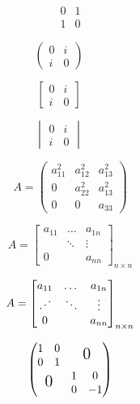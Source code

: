 \documentclass{ctexart}
\newcommand{\adots}{\mathinner{\mkern2mu\raisebox{0.1em}{.}\mkern2mu\raisebox{0.4em}{.}\mkern2mu\raisebox{0.7em}{.}\mkern1mu}}
\begin{document}
	\[
	\begin{matrix} %
		0 & 1 \\
		1 & 0
	\end{matrix}
	\] %
	
	\[
	\begin{pmatrix} %
		0 & i \\
		i & 0
	\end{pmatrix} \qquad
	\]
	
	\[
	\begin{bmatrix} %
		0 & i \\
		i & 0
	\end{bmatrix} \qquad
	\]

	\[
	\begin{vmatrix} %
		0 & i \\
		i & 0
	\end{vmatrix} \qquad
	\]
	
	\[
	A = \begin{pmatrix} %
		a_{11}^2 	& a_{12}^2 	& a_{13}^2 \\
		0 			& a_{22}^2 	& a_{13}^2 \\
		0 			& 0 		& a_{33}
	\end{pmatrix}
	\]
	
	\[
	A = \begin{bmatrix} %
		a_{11} 		& \dots 		& a_{1n} \\
		 			& \ddots 		& \vdots \\
		0 			&  				& a_{nn}
	\end{bmatrix}_{n \times n}
	\]
	
	\[
	A = \begin{bmatrix} %
		a_{11} 		& \dots 		& a_{1n} \\
		\adots		& \ddots 		& \vdots \\
		0 			&  				& a_{nn}
	\end{bmatrix}_{n \times n}
	\]
	
	\[
	\begin{pmatrix}
		\begin{matrix}
			1 & 0 \\
			0 & 1
		\end{matrix} 	& 	\text{\Large 0} \\
		\text{\Large 0} & 	\begin{matrix}
								1 & 0 \\
								0 & -1
						  	\end{matrix}
	\end{pmatrix}
	\]
	
\end{document}
